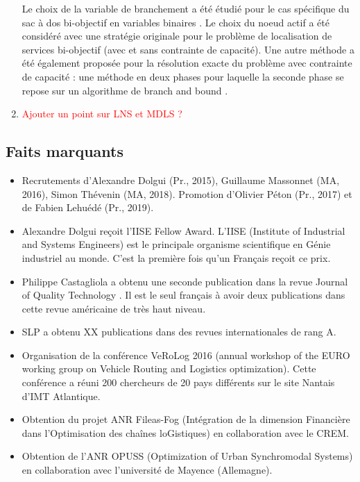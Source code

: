 \begin{enumerate}
Le choix de la variable de branchement a été étudié pour le cas spécifique du sac à dos bi-objectif en variables binaires \cite{cerqueus:hal-01564982}. Le choix du noeud actif a été considéré avec une stratégie originale pour le problème de localisation de services bi-objectif \cite{delmee:hal-01435524} (avec et sans contrainte de capacité). Une autre méthode a  été également proposée pour la résolution exacte du problème avec contrainte de capacité : une méthode en deux phases pour laquelle la seconde phase se repose sur un algorithme de branch and bound \cite{delmee:hal-02480176}. 

\item \textcolor{red}{Ajouter un point sur LNS et MDLS ?}
\end{enumerate}

  		
\subsection{Faits marquants}



\begin{itemize}
    \item Recrutements d'Alexandre Dolgui (Pr., 2015), Guillaume  Massonnet (MA, 2016), Simon  Thévenin (MA, 2018). Promotion  d'Olivier Péton (Pr., 2017) et de Fabien Lehuédé (Pr., 2019).
    \item Alexandre Dolgui reçoit l'IISE Fellow Award. L'IISE (Institute of Industrial and Systems Engineers) est le principale organisme scientifique en Génie industriel au monde. C'est la première fois qu'un Français reçoit ce prix.
    \item Philippe Castagliola a obtenu une seconde publication dans la revue Journal of Quality Technology \cite{castagliola:hal-02002980}. Il est le seul français à avoir deux publications dans cette revue américaine de très haut niveau.
    \item SLP a obtenu XX publications  dans des revues internationales de rang A.
    \item Organisation de la conférence VeRoLog 2016 (annual workshop of the EURO working group on Vehicle Routing and Logistics optimization). Cette conférence a réuni 200 chercheurs de 20 pays différents sur le site Nantais d'IMT Atlantique. 
    \item Obtention du projet ANR Fileas-Fog (Intégration de la dimension Financière dans l’Optimisation des chaînes loGistiques) en collaboration avec le CREM.
    \item Obtention de l'ANR OPUSS (Optimization of Urban Synchromodal Systems) en collaboration avec l'université de Mayence (Allemagne).
\end{itemize}


